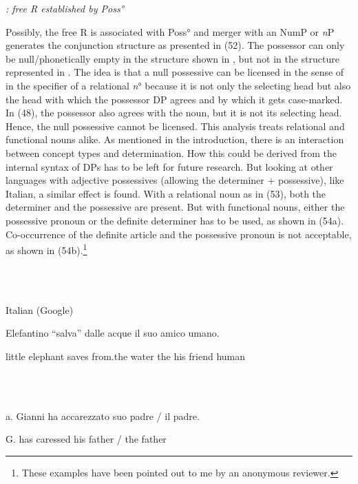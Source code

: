 \documentclass[output=paper]{langsci/langscibook}
\begin{document}
  
 

\textit{: free R established by Poss°}

Possibly, the free R is associated with Poss° and merger with an NumP or \textit{n}P generates the conjunction structure as presented in (52). The possessor can only be null/phonetically empty in the structure shown in , but not in the structure represented in . The idea is that a null possessive can be licensed in the sense of \citet{Rizzi1986} in the specifier of a relational \textit{n}° because it is not only the selecting head but also the head with which the possessor DP agrees and by which it gets case-marked. In (48), the possessor also agrees with the noun, but it is not its selecting head. Hence, the null possessive cannot be licensed. This analysis treats relational and functional nouns alike. As mentioned in the introduction, there is an interaction between concept types and determination. How this could be derived from the internal syntax of DPs has to be left for future research. But looking at other languages with adjective possessives (allowing the determiner + possessive), like Italian, a similar effect is found. With a relational noun as in (53), both the determiner and the possessive are present. But with functional nouns, either the possessive pronoun or the definite determiner has to be used, as shown in (54a). Co-occurrence of the definite article and the possessive pronoun is not acceptable, as shown in (54b).\footnote{These examples have been pointed out to me by an anonymous reviewer.}

\ea%
    \label{ex:key:53}
    \gll\\
        \\
    \glt
    \z

          Italian (Google)

Elefantino “salva” dalle acque il suo amico umano.

little elephant saves from.the water the his friend human

\ea%
    \label{ex:key:54}
    \gll\\
        \\
    \glt
    \z

          a.  Gianni ha accarezzato suo padre / il padre.

G. has caressed his father / the father
\end{document}
